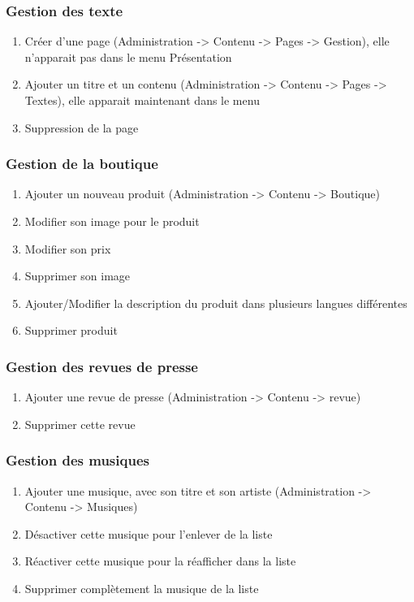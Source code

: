 \documentclass[11pt]{report}
\begin{document}
\subsubsection{Gestion des texte}
\begin{enumerate}
\item Créer d’une page (Administration -> Contenu -> Pages -> Gestion), elle n'apparait pas dans le menu \og Présentation \fg{}
\item Ajouter un titre et un contenu (Administration -> Contenu -> Pages -> Textes), elle apparait maintenant dans le menu
\item Suppression de la page
\end{enumerate}
\subsubsection{Gestion de la boutique}
\begin{enumerate}
\item Ajouter un nouveau produit (Administration -> Contenu -> Boutique)
\item Modifier son image pour le produit
\item Modifier son prix
\item Supprimer son image
\item Ajouter/Modifier la description du produit dans plusieurs langues différentes
\item Supprimer produit
\end{enumerate}
\subsubsection{Gestion des revues de presse}
\begin{enumerate}
\item Ajouter une revue de presse (Administration -> Contenu -> revue)
\item Supprimer cette revue
\end{enumerate}
\subsubsection{Gestion des musiques}
\begin{enumerate}
\item Ajouter une musique, avec son titre et son artiste (Administration -> Contenu -> Musiques)
\item Désactiver cette musique pour l’enlever de la liste
\item Réactiver cette musique pour la réafficher dans la liste
\item Supprimer complètement la musique de la liste
\end{enumerate}
\end{document}

